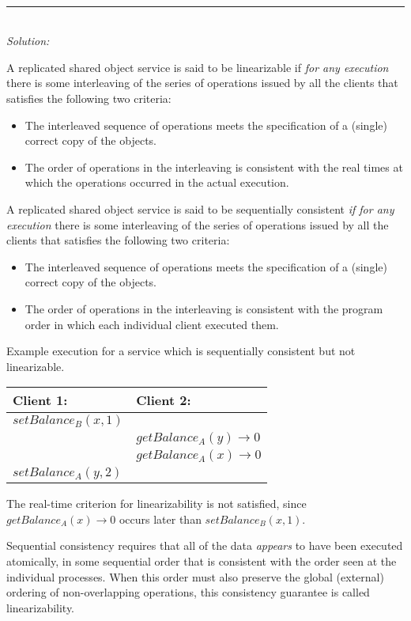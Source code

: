 \documentclass[a4paper]{article}
\newcommand{\horrule}[1]{\rule{\linewidth}{#1}} %
\newcommand{\solution}[1]{\\\horrule{0.5pt}\\[3pt]\textit{Solution: }\\[0.1cm]\begin{minipage}{\textwidth}#1\end{minipage}}
\newcommand{\highlight}[1]{{\color{blue}#1}}
\begin{document}
\solution{
  A replicated shared object service is said to be
  \highlight{linearizable} if \textit{for any execution} there is
  some interleaving of the series of operations issued by all the
  clients that satisfies the following two criteria:
  \begin{itemize}
    \item The interleaved sequence of operations meets the
      specification of a (single) correct copy of the objects.
    \item The order of operations in the interleaving is consistent
      with the \highlight{real times at which the operations
        occurred in the actual execution.}
  \end{itemize}

  A replicated shared object service is said to be
  \highlight{sequentially consistent} \textit{if for any
    execution} there is some interleaving of the series of operations
  issued by all the clients that satisfies the following two criteria:
  \begin{itemize}
    \item The interleaved sequence of operations meets the
      specification of a (single) correct copy of the objects.
    \item The order of operations in the interleaving is consistent
      with the \highlight{program order in which each individual
        client executed them.}
  \end{itemize}

  \begin{center}
    Example execution for a service which is sequentially consistent
    but not linearizable.\\
    \begin{tabular}{| l | l |}\hline
      Client 1: & Client 2: \\\hline
      $setBalance_B(x, 1)$ &\\
      & $getBalance_A(y) \rightarrow 0$\\
      & $getBalance_A(x) \rightarrow 0$\\
      $setBalance_A(y, 2)$ &\\\hline
    \end{tabular}
    The real-time criterion for linearizability is not satisfied,
    since $getBalance_A(x) \rightarrow 0$ occurs later than
    $setBalance_B(x,1)$.\\
  \end{center}

  Sequential consistency requires that all of the data
  \textit{appears} to have been executed atomically, in some sequential
  order that is consistent with the order seen at the individual
  processes. When this order must also preserve the global (external)
  ordering of non-overlapping operations, this consistency guarantee is
  called linearizability.
}
\end{document}
